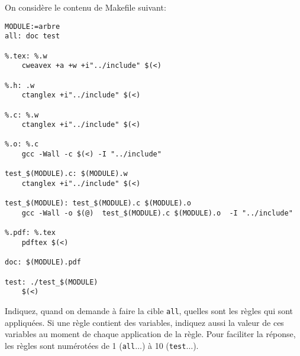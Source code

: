 

On considère le contenu de Makefile suivant:
\lstset{language=[gnu] make}
\lstset{basicstyle=\footnotesize}
\lstset{frame=lrtb,xleftmargin=\fboxsep,xrightmargin=-\fboxsep}
\begin{lstlisting}
MODULE:=arbre
all: doc test

%.tex: %.w
	cweavex +a +w +i"../include" $(<)

%.h: .w
	ctanglex +i"../include" $(<)

%.c: %.w
	ctanglex +i"../include" $(<)

%.o: %.c 
	gcc -Wall -c $(<) -I "../include"

test_$(MODULE).c: $(MODULE).w
	ctanglex +i"../include" $(<)

test_$(MODULE): test_$(MODULE).c $(MODULE).o
	gcc -Wall -o $(@)  test_$(MODULE).c $(MODULE).o  -I "../include"

%.pdf: %.tex
	pdftex $(<)

doc: $(MODULE).pdf

test: ./test_$(MODULE)
	$(<)
\end{lstlisting}

\question Indiquez, quand on demande à faire la cible \texttt{all},
quelles sont les règles qui sont appliquées. Si une règle contient des variables,
indiquez aussi la valeur de ces variables au moment de chaque application de la
règle. Pour faciliter la réponse, les règles sont numérotées de 1 (\texttt{all}\(\ldots\)) à 10 (\texttt{test}\(\ldots\)).

